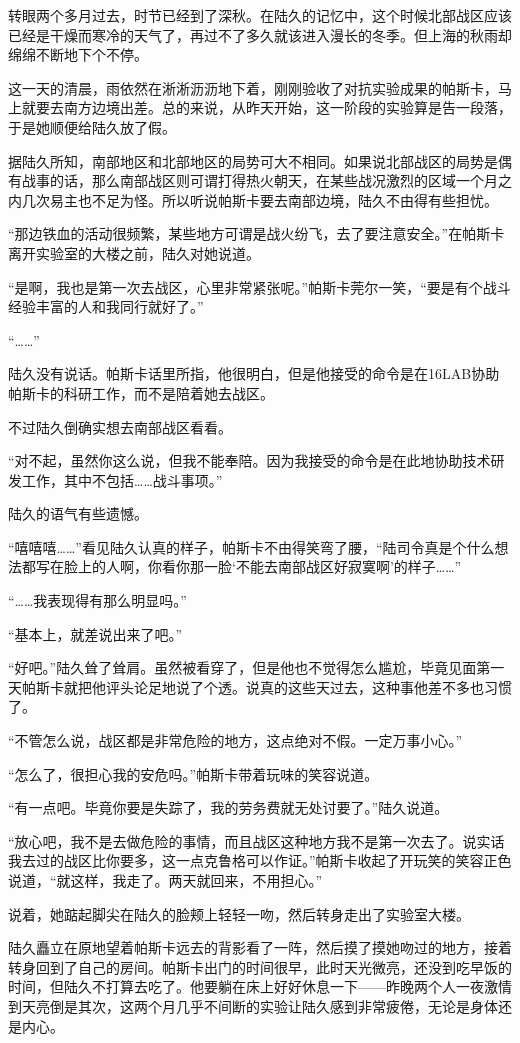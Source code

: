 转眼两个多月过去，时节已经到了深秋。在陆久的记忆中，这个时候北部战区应该已经是干燥而寒冷的天气了，再过不了多久就该进入漫长的冬季。但上海的秋雨却绵绵不断地下个不停。

这一天的清晨，雨依然在淅淅沥沥地下着，刚刚验收了对抗实验成果的帕斯卡，马上就要去南方边境出差。总的来说，从昨天开始，这一阶段的实验算是告一段落，于是她顺便给陆久放了假。

据陆久所知，南部地区和北部地区的局势可大不相同。如果说北部战区的局势是偶有战事的话，那么南部战区则可谓打得热火朝天，在某些战况激烈的区域一个月之内几次易主也不足为怪。所以听说帕斯卡要去南部边境，陆久不由得有些担忧。

“那边铁血的活动很频繁，某些地方可谓是战火纷飞，去了要注意安全。”在帕斯卡离开实验室的大楼之前，陆久对她说道。

“是啊，我也是第一次去战区，心里非常紧张呢。”帕斯卡莞尔一笑，“要是有个战斗经验丰富的人和我同行就好了。”

“……”

陆久没有说话。帕斯卡话里所指，他很明白，但是他接受的命令是在16LAB协助帕斯卡的科研工作，而不是陪着她去战区。

不过陆久倒确实想去南部战区看看。

“对不起，虽然你这么说，但我不能奉陪。因为我接受的命令是在此地协助技术研发工作，其中不包括……战斗事项。”

陆久的语气有些遗憾。

“嘻嘻嘻……”看见陆久认真的样子，帕斯卡不由得笑弯了腰，“陆司令真是个什么想法都写在脸上的人啊，你看你那一脸‘不能去南部战区好寂寞啊’的样子……”

“……我表现得有那么明显吗。”

“基本上，就差说出来了吧。”

“好吧。”陆久耸了耸肩。虽然被看穿了，但是他也不觉得怎么尴尬，毕竟见面第一天帕斯卡就把他评头论足地说了个透。说真的这些天过去，这种事他差不多也习惯了。

“不管怎么说，战区都是非常危险的地方，这点绝对不假。一定万事小心。”

“怎么了，很担心我的安危吗。”帕斯卡带着玩味的笑容说道。

“有一点吧。毕竟你要是失踪了，我的劳务费就无处讨要了。”陆久说道。

“放心吧，我不是去做危险的事情，而且战区这种地方我不是第一次去了。说实话我去过的战区比你要多，这一点克鲁格可以作证。”帕斯卡收起了开玩笑的笑容正色说道，“就这样，我走了。两天就回来，不用担心。”

说着，她踮起脚尖在陆久的脸颊上轻轻一吻，然后转身走出了实验室大楼。

陆久矗立在原地望着帕斯卡远去的背影看了一阵，然后摸了摸她吻过的地方，接着转身回到了自己的房间。帕斯卡出门的时间很早，此时天光微亮，还没到吃早饭的时间，但陆久不打算去吃了。他要躺在床上好好休息一下——昨晚两个人一夜激情到天亮倒是其次，这两个月几乎不间断的实验让陆久感到非常疲倦，无论是身体还是内心。

